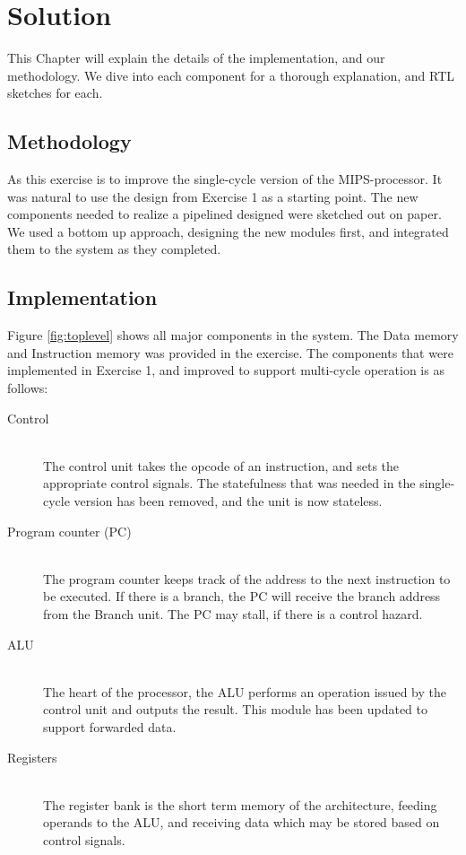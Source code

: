 \chapter{Solution}
This Chapter will explain the details of the implementation, and our methodology. We dive into each component for a thorough explanation, and RTL sketches for each.


\section{Methodology}
As this exercise is to improve the single-cycle version of the MIPS-processor. It was natural to use the design from Exercise 1 \cite{ex1report} as a starting point.
The new components needed to realize a pipelined designed were sketched out on paper. We used a bottom up approach, designing the new modules first, and integrated them to the system as they completed.

\section{Implementation}
Figure \ref{fig:toplevel} shows all major components in the system. 
The Data memory and Instruction memory was provided in the exercise.
The components that were implemented in Exercise 1, and improved to support multi-cycle operation is as follows:

\begin{description}
  \item[Control] \hfill \\
  The control unit takes the opcode of an instruction, and sets the appropriate control signals. The statefulness that was needed in the single-cycle version has been removed, and the unit is now stateless.  
  \item[Program counter (PC)] \hfill \\
  The program counter keeps track of the address to the next instruction to be executed. If there is a branch, the PC will receive the branch address from the Branch unit. The PC may stall, if there is a control hazard.
  \item[ALU] \hfill \\
  The heart of the processor, the ALU performs an operation issued by the control unit and outputs the result. This module has been updated to support forwarded data.
  \item[Registers] \hfill \\
  The register bank is the short term memory of the architecture, feeding operands to the ALU, and receiving data which may be stored based on control signals.
\end{description}

